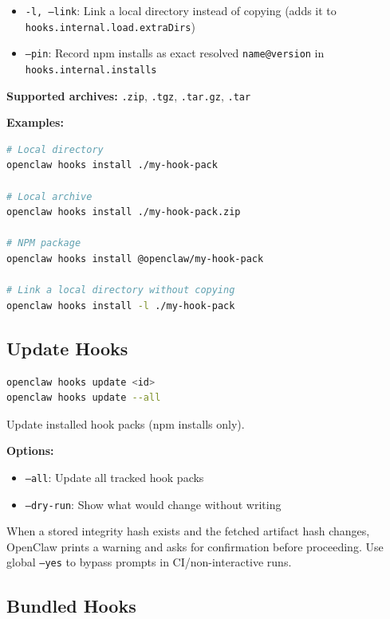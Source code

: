 \begin{itemize}
  \item \texttt{-l, --link}: Link a local directory instead of copying (adds it to \texttt{hooks.internal.load.extraDirs})
  \item \texttt{--pin}: Record npm installs as exact resolved \texttt{name@version} in \texttt{hooks.internal.installs}
\end{itemize}


\textbf{Supported archives:} \texttt{.zip}, \texttt{.tgz}, \texttt{.tar.gz}, \texttt{.tar}

\textbf{Examples:}

\begin{lstlisting}[language=bash]
# Local directory
openclaw hooks install ./my-hook-pack

# Local archive
openclaw hooks install ./my-hook-pack.zip

# NPM package
openclaw hooks install @openclaw/my-hook-pack

# Link a local directory without copying
openclaw hooks install -l ./my-hook-pack
\end{lstlisting}


\subsection{Update Hooks}


\begin{lstlisting}[language=bash]
openclaw hooks update <id>
openclaw hooks update --all
\end{lstlisting}


Update installed hook packs (npm installs only).

\textbf{Options:}

\begin{itemize}
  \item \texttt{--all}: Update all tracked hook packs
  \item \texttt{--dry-run}: Show what would change without writing
\end{itemize}


When a stored integrity hash exists and the fetched artifact hash changes,
OpenClaw prints a warning and asks for confirmation before proceeding. Use
global \texttt{--yes} to bypass prompts in CI/non-interactive runs.

\subsection{Bundled Hooks}


